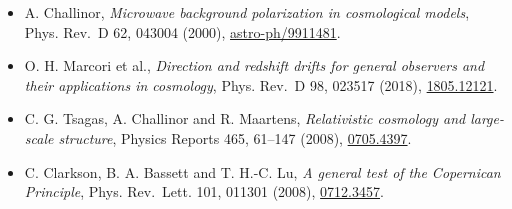 \documentclass[
  10pt,
]{article}
\providecommand{\tightlist}{%
  \setlength{\itemsep}{0pt}\setlength{\parskip}{0pt}}
\begin{document}
\begin{itemize}
\tightlist
\item
  A. Challinor, \emph{Microwave background polarization in cosmological
  models}, Phys. Rev.~D 62, 043004 (2000),
  \href{https://arxiv.org/abs/astro-ph/9911481}{astro-ph/9911481}.
\item
  O. H. Marcori et al., \emph{Direction and redshift drifts for general
  observers and their applications in cosmology}, Phys. Rev.~D 98,
  023517 (2018), \href{https://arxiv.org/abs/1805.12121}{1805.12121}.
\item
  C. G. Tsagas, A. Challinor and R. Maartens, \emph{Relativistic
  cosmology and large-scale structure}, Physics Reports 465, 61--147
  (2008), \href{https://arxiv.org/abs/0705.4397}{0705.4397}.
\item
  C. Clarkson, B. A. Bassett and T. H.-C. Lu, \emph{A general test of
  the Copernican Principle}, Phys. Rev.~Lett. 101, 011301 (2008),
  \href{https://arxiv.org/abs/0712.3457}{0712.3457}.
\end{itemize}
\end{document}
